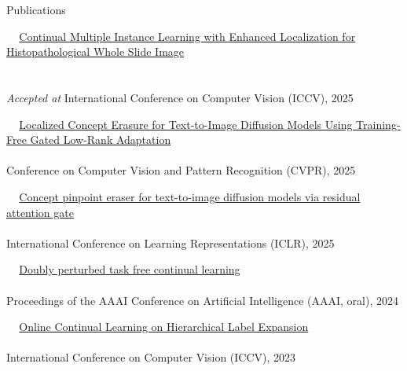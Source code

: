 \documentclass{resume} %
\begin{document}
\begin{rSection}{Publications {}}

\textbullet~\,\, \href{https://arxiv.org/pdf/2507.02395}{Continual Multiple Instance Learning with Enhanced Localization for Histopathological Whole Slide Image \\ \hspace*{1.5em}{Analysis}} 
\\ 
\\ \hspace*{1.5em} \textit{Accepted at} International Conference on Computer Vision (ICCV), 2025

\textbullet~\,\, \href{https://arxiv.org/abs/2503.12356}{Localized Concept Erasure for Text-to-Image Diffusion Models Using Training-Free Gated Low-Rank Adaptation}
\\ 
\\ \hspace*{1.5em}Conference on Computer Vision and Pattern Recognition (CVPR), 2025

\textbullet~\,\, \href{https://arxiv.org/abs/2312.13027}{Concept pinpoint eraser for text-to-image diffusion models via residual attention gate}
\\ 
\\ \hspace*{1.5em}International Conference on Learning Representations (ICLR), 2025

\textbullet~\,\, \href{https://arxiv.org/abs/2312.13027}{Doubly perturbed task free continual learning}
\\ 
\\ \hspace*{1.5em}Proceedings of the AAAI Conference on Artificial Intelligence (AAAI, oral), 2024

\textbullet~\,\, \href{https://ieeexplore.ieee.org/document/10377260}{Online Continual Learning on Hierarchical Label Expansion
}
\\ 
\\ \hspace*{1.5em}International Conference on Computer Vision (ICCV), 2023



\end{rSection}
\end{document}
